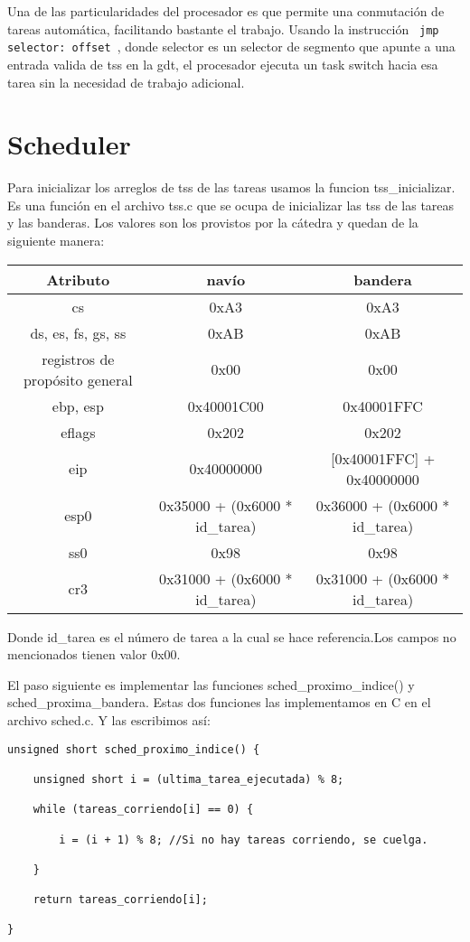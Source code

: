 \documentclass[10pt, a4paper]{article}
\begin{document}
Una de las particularidades del procesador es que permite una conmutaci\'on de tareas autom\'atica, facilitando bastante el trabajo. Usando la instrucci\'on
\verb| jmp selector: offset |, donde selector es un selector de segmento que apunte a una entrada valida de tss en la gdt, el procesador ejecuta un task switch
hacia esa tarea sin la necesidad de trabajo adicional.


\section{Scheduler}

Para inicializar los arreglos de tss de las tareas usamos la funcion tss\_inicializar. Es una funci\'on en el archivo tss.c que se ocupa de inicializar las tss
de las tareas y las banderas. Los valores son los provistos por la c\'atedra y quedan de la siguiente manera:

\begin{center}
\begin{tabular}{| c || c | c |}

	\hline
		Atributo & nav\'io & bandera \\
	\hline
		cs & 0xA3 & 0xA3 \\
		ds, es, fs, gs, ss & 0xAB & 0xAB \\
		registros de prop\'osito general & 0x00 & 0x00 \\
		ebp, esp & 0x40001C00 & 0x40001FFC \\
		eflags & 0x202 & 0x202 \\
		eip & 0x40000000 & [0x40001FFC] + 0x40000000 \\
		esp0 & 0x35000 + (0x6000 * id\_tarea) & 0x36000 + (0x6000 * id\_tarea) \\
		ss0 & 0x98 & 0x98 \\
		cr3 & 0x31000 + (0x6000 * id\_tarea) & 0x31000 + (0x6000 * id\_tarea) \\
	\hline

\end{tabular}
\end{center}

Donde id\_tarea es el n\'umero de tarea a la cual se hace referencia.Los campos no mencionados tienen valor 0x00.

El paso siguiente es implementar las funciones sched\_proximo\_indice() y sched\_proxima\_bandera. Estas dos funciones las implementamos en C en el archivo sched.c.
Y las escribimos as\'i:

\begin{lstlisting}
unsigned short sched_proximo_indice() {
	
	unsigned short i = (ultima_tarea_ejecutada) % 8;
       
    while (tareas_corriendo[i] == 0) {
               
    	i = (i + 1) % 8; //Si no hay tareas corriendo, se cuelga.
               
    }
       
    return tareas_corriendo[i];
	
}
\end{lstlisting}
\end{document}

